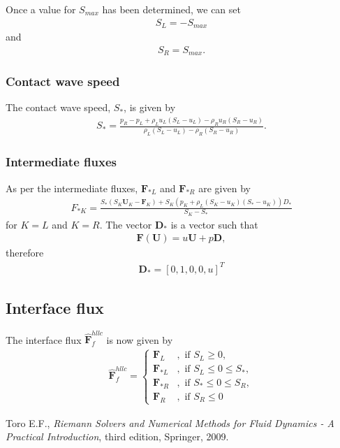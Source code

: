 \documentclass[10pt,letterpaper,notitlepage]{article}
\numberwithin{equation}{section}
\newcommand{\hatbf}[1]{\hat{\mathbf{#1}}}
\newcommand{\beqn}{\begin{equation}\begin{aligned}}
\newcommand{\eeqn}{\end{aligned}\end{equation}}
\begin{document}
Once a value for $S_{max}$ has been determined, we can set 
\beqn 
S_L = -S_{max}
\eeqn 
and
\beqn 
S_R = S_{max}.
\eeqn 

\subsubsection{Contact wave speed}
The contact wave speed, $S_*$, is given by
\beqn 
S_* = \frac{p_R - p_L +\rho_L u_L(S_L-u_L) - \rho_R u_R(S_R-u_R)}
{\rho_L (S_L-u_L) - \rho_R(S_R-u_R)}.
\eeqn 

\subsubsection{Intermediate fluxes}
As per \cite{Toro} the intermediate fluxes, $\mathbf{F}_{*L}$ and $\mathbf{F}_{*R}$ are given by
\beqn 
F_{*K} = 
\frac
{S_* (S_K \mathbf{U}_K - \mathbf{F}_K) + S_K(p_K+\rho_L(S_K-u_K)(S_*-u_K))D_*}
{S_K - S_*}
\eeqn 
for $K=L$ and $K=R$. The vector $\mathbf{D}_*$ is a vector such that
\beqn 
\mathbf{F}(\mathbf{U}) = u \mathbf{U} + p\mathbf{D},
\eeqn 
therefore 
\beqn 
\mathbf{D}_* = [0,1,0,0,u]^T
\eeqn 

\subsection{Interface flux}
The interface flux $\hatbf{F}_f^{hllc}$ is now given by
\beqn 
\hatbf{F}_f^{hllc} = 
\begin{cases}
\mathbf{F}_L &,\text{ if } S_L \ge 0, \\
\mathbf{F}_{*L} &,\text{ if } S_L \le 0 \le S_*, \\
\mathbf{F}_{*R} &,\text{ if } S_* \le 0 \le S_R, \\
\mathbf{F}_R &,\text{ if } S_R \le 0
\end{cases}
\eeqn 

\newpage
\begin{thebibliography}{1}
	
	
	 Toro E.F., {\em Riemann Solvers and Numerical Methods for Fluid Dynamics - A Practical Introduction}, third edition, Springer, 2009.
	   
\end{thebibliography}
\end{document}
